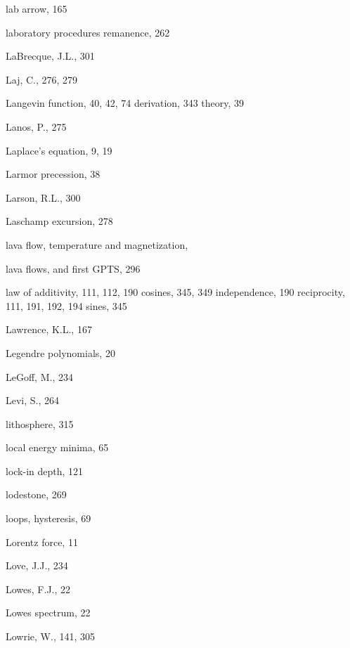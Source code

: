 \documentclass[,plain]{tauxe}
\begin{document}
\begin{theindex}
  \indexspace
  \item lab arrow, 165
  \item laboratory procedures
    \subitem remanence, 262
  \item LaBrecque, J.L., 301
  \item Laj, C., 276, 279
  \item Langevin
    \subitem function, 40, 42, 74
		\subsubitem derivation, 343
	\subitem theory, 39	
  \item Lanos, P., 275
  \item Laplace's equation, 9, 19
  \item Larmor precession, 38
  \item Larson, R.L., 300
  \item Laschamp excursion, 278
  \item lava flow, temperature and magnetization,
  \item lava flows, and first GPTS, 296
  \item law of
    \subitem additivity, 111, 112, 190
    \subitem cosines, 345, 349
    \subitem independence, 190
    \subitem reciprocity, 111, 191, 192, 194
    \subitem sines, 345
  \item Lawrence, K.L., 167
  \item Legendre polynomials, 20
  \item LeGoff, M., 234
  \item Levi, S., 264
  \item lithosphere, 315
  \item local energy minima, 65
  \item lock-in depth, 121
  \item lodestone, 269
  \item loops, hysteresis, 69
  \item Lorentz force, 11
  \item Love, J.J., 234
  \item Lowes, F.J., 22
  \item Lowes spectrum, 22
  \item Lowrie, W., 141, 305

  \indexspace


\end{theindex}
\end{document}
